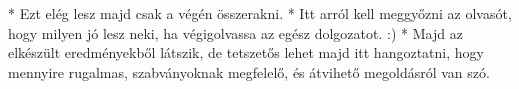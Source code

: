 
* Ezt elég lesz majd csak a végén összerakni.
* Itt arról kell meggyőzni az olvasót, hogy milyen jó lesz neki, ha végigolvassa az egész dolgozatot. :)
* Majd az elkészült eredményekből látszik, de tetszetős lehet majd itt hangoztatni, hogy mennyire rugalmas, szabványoknak megfelelő, és átvihető megoldásról van szó.
